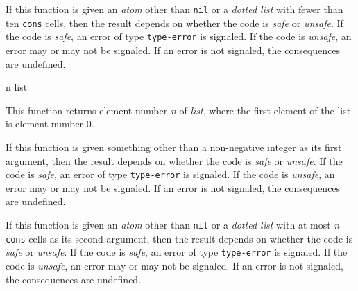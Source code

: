If this function is given an \emph{atom} other than \texttt{nil} or a
\emph{dotted list} with fewer than ten \texttt{cons} cells, then the
result depends on whether the code is \emph{safe} or \emph{unsafe}.
If the code is \emph{safe}, an error of type \texttt{type-error} is
signaled.  If the code is \emph{unsafe}, an error may or may not be
signaled.  If an error is not signaled, the consequences are
undefined.

 {n list}

This function returns element number \textit{n} of \textit{list},
where the first element of the list is element number $0$.

If this function is given something other than a non-negative integer
as its first argument, then the result depends on whether the code is
\emph{safe} or \emph{unsafe}.  If the code is \emph{safe}, an error of
type \texttt{type-error} is signaled.  If the code is \emph{unsafe},
an error may or may not be signaled.  If an error is not signaled, the
consequences are undefined.

If this function is given an \emph{atom} other than \texttt{nil} or a
\emph{dotted list} with at most \textit{n} \texttt{cons} cells as its
second argument, then the result depends on whether the code is
\emph{safe} or \emph{unsafe}.  If the code is \emph{safe}, an error of
type \texttt{type-error} is signaled.  If the code is \emph{unsafe},
an error may or may not be signaled.  If an error is not signaled, the
consequences are undefined.
